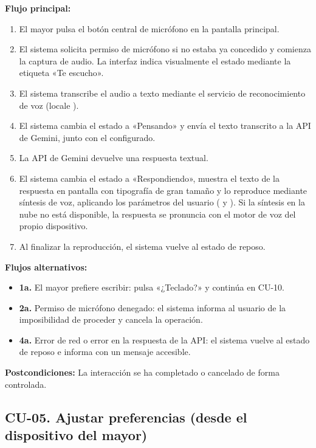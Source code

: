 \noindent\textbf{Flujo principal:}
\begin{enumerate}[nosep]
    \item El mayor pulsa el botón central de micrófono en la pantalla principal.
    \item El sistema solicita permiso de micrófono si no estaba ya concedido y comienza la captura de
    audio. La interfaz indica visualmente el estado mediante la etiqueta «Te escucho».
    \item El sistema transcribe el audio a texto mediante el servicio de reconocimiento de voz
    (locale ).
    \item El sistema cambia el estado a «Pensando» y envía el texto transcrito a la API de Gemini, junto
    con el  configurado.
    \item La API de Gemini devuelve una respuesta textual.
    \item El sistema cambia el estado a «Respondiendo», muestra el texto de la respuesta en pantalla con
    tipografía de gran tamaño y lo reproduce mediante síntesis de voz, aplicando los parámetros del usuario
    ( y ). Si la síntesis en la nube no está disponible, la respuesta se
    pronuncia con el motor de voz del propio dispositivo.
    \item Al finalizar la reproducción, el sistema vuelve al estado de reposo.
\end{enumerate}

\noindent\textbf{Flujos alternativos:}
\begin{itemize}[nosep]
    \item \textbf{1a.} El mayor prefiere escribir: pulsa «¿Teclado?» y continúa en CU-10.
    \item \textbf{2a.} Permiso de micrófono denegado: el sistema informa al usuario de la imposibilidad
    de proceder y cancela la operación.
    \item \textbf{4a.} Error de red o error en la respuesta de la API: el sistema vuelve al estado de
    reposo e informa con un mensaje accesible.
\end{itemize}

\noindent\textbf{Postcondiciones:} La interacción se ha completado o cancelado de forma controlada.

\bigskip

\subsection*{CU-05. Ajustar preferencias (desde el dispositivo del mayor)}

